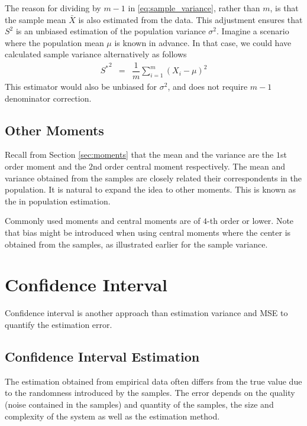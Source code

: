 The reason for dividing by $m-1$ in \eqref{eq:sample_variance}, rather than $m$, is that the sample mean $\bar{X}$ is also estimated from the data. This adjustment ensures that $S^2$ is an unbiased estimation of the population variance $\sigma^2$. Imagine a scenario where the population mean $\mu$ is known in advance. In that case, we could have calculated sample variance alternatively as follows
\begin{eqnarray}
	{S^*}^2 &=& \dfrac{1}{m}\sum_{i=1}^{m}\left(X_i - \mu\right)^2 \nonumber
\end{eqnarray}
This estimator would also be unbiased for $\sigma^2$, and does not require $m-1$ denominator correction.

\subsection{Other Moments}

Recall from Section \ref{sec:moments} that the mean and the variance are the $1$st order moment and the $2$nd order central moment respectively. The mean and variance obtained from the samples are closely related their correspondents in the population. It is natural to expand the idea to other moments. This is known as the  in population estimation.

Commonly used moments and central moments are of $4$-th order or lower. Note that bias might be introduced when using central moments where the center is obtained from the samples, as illustrated earlier for the sample variance.

\section{Confidence Interval} 

Confidence interval is another approach than estimation variance and MSE to quantify the estimation error.

\subsection{Confidence Interval Estimation}

The estimation obtained from empirical data often differs from the true value due to the randomness introduced by the samples. The error depends on the quality (noise contained in the samples) and quantity of the samples, the size and complexity of the system as well as the estimation method. 

